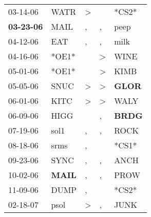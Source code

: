 \begin{supertabular}{p{0.07\textwidth}p{0.06\textwidth}p{0.02\textwidth}p{0.02\textwidth}p{0.06\textwidth}}
          03-14-06\textsuperscript{} &           WATR\textsuperscript{} &     \textgreater &                  &                            *CS2* \\
 \textbf{03-23-06\textsuperscript{}} &           MAIL\textsuperscript{} &                , &                , &           peep\textsuperscript{} \\
          04-12-06\textsuperscript{} &            EAT\textsuperscript{} &                , &                , &           milk\textsuperscript{} \\
          04-16-06\textsuperscript{} &                            *OE1* &                  &     \textgreater &           WINE\textsuperscript{} \\
          05-01-06\textsuperscript{} &                            *OE1* &                  &     \textgreater &           KIMB\textsuperscript{} \\
          05-05-06\textsuperscript{} &           SNUC\textsuperscript{} &     \textgreater &     \textgreater &  \textbf{GLOR\textsuperscript{}} \\
          06-01-06\textsuperscript{} &           KITC\textsuperscript{} &     \textgreater &     \textgreater &           WALY\textsuperscript{} \\
          06-09-06\textsuperscript{} &           HIGG\textsuperscript{} &                  &                , &  \textbf{BRDG\textsuperscript{}} \\
          07-19-06\textsuperscript{} &           sol1\textsuperscript{} &                , &                , &           ROCK\textsuperscript{} \\
          08-18-06\textsuperscript{} &           srms\textsuperscript{} &                , &                  &                            *CS1* \\
          09-23-06\textsuperscript{} &           SYNC\textsuperscript{} &                , &                , &           ANCH\textsuperscript{} \\
          10-02-06\textsuperscript{} &  \textbf{MAIL\textsuperscript{}} &                , &                , &           PROW\textsuperscript{} \\
          11-09-06\textsuperscript{} &           DUMP\textsuperscript{} &                , &                  &                            *CS2* \\
          02-18-07\textsuperscript{} &           psol\textsuperscript{} &     \textgreater &                , &           JUNK\textsuperscript{} \\

\end{supertabular}
